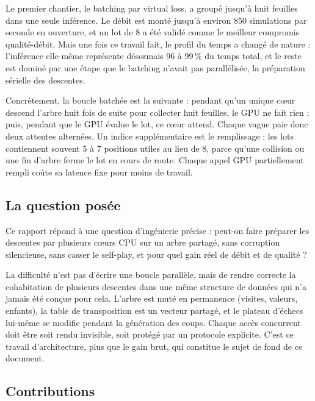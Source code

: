 Le premier chantier, le batching par virtual loss, a group\'e jusqu'\`a huit
feuilles dans une seule inf\'erence. Le d\'ebit est mont\'e jusqu'\`a environ
850 simulations par seconde en ouverture, et un lot de 8 a \'et\'e valid\'e
comme le meilleur compromis qualit\'e-d\'ebit. Mais une fois ce travail fait,
le profil du temps a chang\'e de nature : l'inf\'erence elle-m\^eme repr\'esente
d\'esormais 96 \`a 99\,\% du temps total, et le reste est domin\'e par une
\'etape que le batching n'avait pas parall\'elis\'ee, la pr\'eparation s\'erielle
des descentes.

Concr\`etement, la boucle batch\'ee est la suivante : pendant qu'un unique
c\oe{}ur descend l'arbre huit fois de suite pour collecter huit feuilles, le
GPU ne fait rien ; puis, pendant que le GPU \'evalue le lot, ce c\oe{}ur attend.
Chaque vague paie donc deux attentes altern\'ees. Un indice suppl\'ementaire
est le remplissage : les lots contiennent souvent 5 \`a 7 positions utiles au
lieu de 8, parce qu'une collision ou une fin d'arbre ferme le lot en cours de
route. Chaque appel GPU partiellement rempli co\^ute sa latence fixe pour moins
de travail.

\subsection{La question pos\'ee}

Ce rapport r\'epond \`a une question d'ing\'enierie pr\'ecise : peut-on faire
pr\'eparer les descentes par plusieurs c\oe{}urs CPU sur un arbre partag\'e,
sans corruption silencieuse, sans casser le self-play, et pour quel gain
r\'eel de d\'ebit et de qualit\'e ?

La difficult\'e n'est pas d'\'ecrire une boucle parall\`ele, mais de rendre
correcte la cohabitation de plusieurs descentes dans une m\^eme structure de
donn\'ees qui n'a jamais \'et\'e con\c{c}ue pour cela. L'arbre est mut\'e en
permanence (visites, valeurs, enfants), la table de transposition est un
vecteur partag\'e, et le plateau d'\'echecs lui-m\^eme se modifie pendant la
g\'en\'eration des coups. Chaque acc\`es concurrent doit \^etre soit rendu
invisible, soit prot\'eg\'e par un protocole explicite. C'est ce travail
d'architecture, plus que le gain brut, qui constitue le sujet de fond de ce
document.

\subsection{Contributions}

